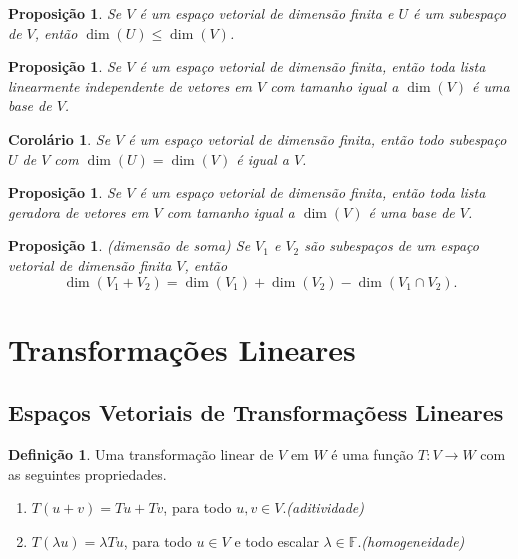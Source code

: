 \documentclass[12pt]{article}
\theoremstyle{plain}
\newtheorem{prop}[thm]{Proposição}
\newtheorem{cor}[thm]{Corolário}
\theoremstyle{definition}
\newtheorem{defn}{Definição}[section]
\theoremstyle{remark}
\begin{document}
\begin{prop}
    Se \(V\) é um espaço vetorial de dimensão finita e \(U\) é um subespaço de \(V\), então \(\dim(U) \leq \dim(V)\).
\end{prop}

\begin{prop}
    Se \(V\) é um espaço vetorial de dimensão finita, então toda lista linearmente independente de vetores em \(V\) com tamanho igual a \(\dim(V)\) é uma base de \(V\).
\end{prop}

\begin{cor}
    Se \(V\) é um espaço vetorial de dimensão finita, então todo subespaço \(U\) de \(V\) com \(\dim(U) = \dim(V)\) é igual a \(V\).
\end{cor}

\begin{prop}
    Se \(V\) é um espaço vetorial de dimensão finita, então toda lista geradora de vetores em \(V\) com tamanho igual a \(\dim(V)\) é uma base de \(V\).
\end{prop}

\begin{prop} (dimensão de soma)
    Se \(V_1\) e \(V_2\) são subespaços de um espaço vetorial de dimensão finita \(V\), então
    \begin{equation}
        \dim(V_1 + V_2) = \dim(V_1) + \dim(V_2) - \dim(V_1 \cap V_2).
    \end{equation}
\end{prop}

\section{Transformações Lineares}

\subsection{Espaços Vetoriais de Transformaçõess Lineares}
\begin{defn}
    Uma transformação linear de \(V\) em \(W\) é uma função \(T: V \to W\) com as seguintes propriedades.
    \begin{enumerate}
        \item \(T(u + v) = Tu + Tv\), para todo \(u, v \in V\).\hfill\emph{(aditividade)}
        \item \(T(\lambda u) = \lambda Tu\), para todo \(u \in V\) e todo escalar \(\lambda \in \mathbb{F}\).\hfill\emph{(homogeneidade)}
    \end{enumerate}
\end{defn}
\end{document}
